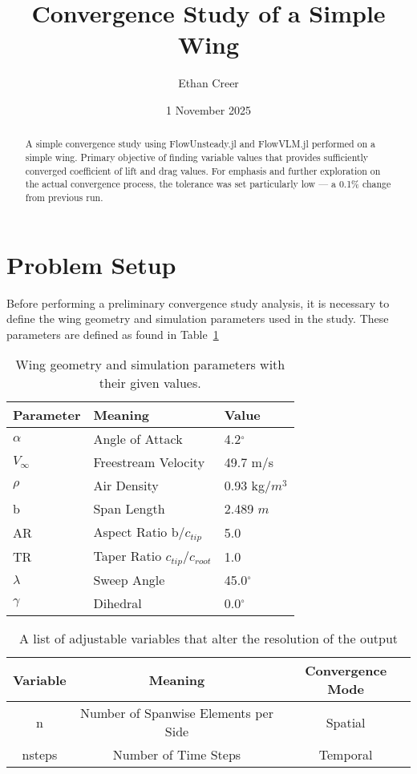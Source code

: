 \documentclass{article}
\title{Convergence Study of a Simple Wing}
\author{Ethan Creer}
\date{1 November 2025}
\begin{document}
\maketitle
\begin{abstract}
    A simple convergence study using FlowUnsteady.jl and FlowVLM.jl performed on a simple wing. Primary objective of finding variable values that provides sufficiently converged coefficient of lift and drag values.
    For emphasis and further exploration on the actual convergence process, the tolerance was set particularly low --- a 0.1\% change from previous run.
\end{abstract}
\section{Problem Setup}

Before performing a preliminary convergence study analysis, it is necessary to define the wing geometry and simulation parameters used in the study.
These parameters are defined as found in Table~\ref{tab:geometry}

\begin{table}[H]
    \centering
    \caption{Wing geometry and simulation parameters with their given values.}\label{tab:geometry}
    \begin{tabular}{l l l}
        \toprule
        \textbf{Parameter} & \textbf{Meaning} & \textbf{Value} \\
        \midrule
        $\alpha$ & Angle of Attack & 4.2$^\circ$ \\
        $V_{\infty}$ & Freestream Velocity & 49.7 m/s \\
        $\rho$ & Air Density & 0.93 kg/$m^3$ \\
        b & Span Length & 2.489 $m$ \\
        AR & Aspect Ratio b/${c_{tip}}$ & 5.0 \\
        TR & Taper Ratio ${c_{tip}}/{c_{root}}$ & 1.0 \\
        $\lambda$ & Sweep Angle & 45.0$^\circ$ \\
        $\gamma$ & Dihedral & 0.0$^\circ$ \\

    \end{tabular}
\end{table}




\begin{table}[H]
    \centering
    \caption{A list of adjustable variables that alter the resolution of the output}\label{tab:adjustables}
    \begin{tabular}{c c c}
        \toprule
        \textbf{Variable} & \textbf{Meaning} & \textbf{Convergence Mode} \\
        \midrule
        n & Number of Spanwise Elements per Side & Spatial \\
        nsteps & Number of Time Steps & Temporal \\
        \bottomrule
    \end{tabular}
\end{table}
\end{document}
